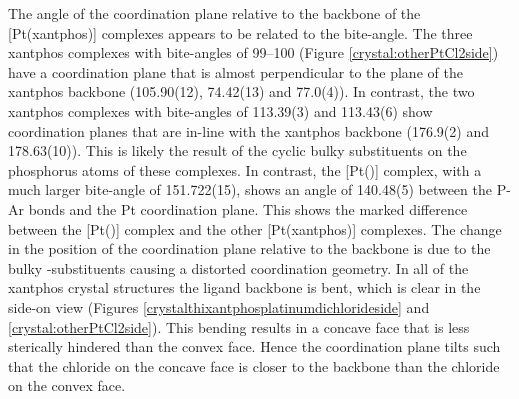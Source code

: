 The angle of the coordination plane relative to the backbone of the [Pt(xant\-phos)] complexes appears to be related to the bite-angle.  The three xantphos complexes with bite-angles of 99--100\degrees{} (Figure \ref{crystal:otherPtCl2side}) have a coordination plane that is almost perpendicular to the plane of the xantphos backbone (105.90(12)\degrees{}, 74.42(13)\degrees{} and 77.0(4)\degrees).  In contrast, the two xantphos complexes with bite-angles of 113.39(3) and 113.43(6)\degrees{} show coordination planes that are in-line with the xantphos backbone (176.9(2)\degrees{} and 178.63(10)\degrees{}).  This is likely the result of the cyclic bulky substituents on the phosphorus atoms of these complexes.  In contrast, the [Pt(\tButhixantphos)] complex, with a much larger bite-angle of 151.722(15)\degrees{}, shows an angle of 140.48(5)\degrees{} between the P-Ar bonds and the Pt coordination plane.  This shows the marked difference between the [Pt(\tButhixantphos)] complex and the other [Pt(xantphos)] complexes.  The change in the position of the coordination plane relative to the backbone is due to the bulky \tBu-substituents causing a distorted \trans{} coordination geometry.  In all of the xantphos crystal structures the ligand backbone is bent, which is clear in the side-on view (Figures \ref{crystalthixantphosplatinumdichlorideside} and \ref{crystal:otherPtCl2side}).  This bending results in a concave face that is less sterically hindered than the convex face.  Hence the coordination plane tilts such that the chloride on the concave face is closer to the backbone than the chloride on the convex face.  

